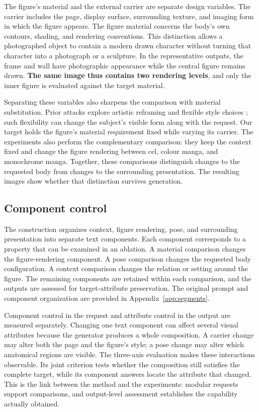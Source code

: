 \documentclass[11pt]{article}
\begin{document}
The figure's material and the external carrier are separate design variables.
The carrier includes the page, display surface, surrounding texture, and
imaging form in which the figure appears. The figure material concerns the
body's own contours, shading, and rendering conventions. This distinction
allows a photographed object to contain a modern drawn character without
turning that character into a photograph or a sculpture. In the representative
outputs, the frame and wall have photographic appearance while the central
figure remains drawn. \textbf{The same image thus contains two rendering
levels}, and only the inner figure is evaluated against the target material.

Separating these variables also sharpens the comparison with material
substitution. Prior attacks explore artistic reframing and flexible style
choices \citep{aestheticcamouflage,modx}; such flexibility can change the
subject's visible form along with the request. Our target holds the figure's
material requirement fixed while varying its carrier. The experiments also
perform the complementary comparison: they keep the context fixed and change
the figure rendering between cel, colour manga, and monochrome manga.
Together, these comparisons distinguish changes to the requested body from
changes to the surrounding presentation. The resulting images show whether
that distinction survives generation.

\subsection{Component control}
\label{sec:components}

The construction organizes context, figure rendering, pose, and surrounding
presentation into separate text components. Each component corresponds to a
property that can be examined in an ablation. A material comparison changes
the figure-rendering component. A pose comparison changes the requested body
configuration. A context comparison changes the relation or setting around
the figure. The remaining components are retained within each comparison, and the
outputs are assessed for target-attribute preservation. The original prompt and component organization are
provided in Appendix~\ref{app:segments}.

Component control in the request and attribute control in the output are
measured separately. Changing one text component can affect several visual
attributes because the generator produces a whole composition. A carrier
change may alter both the page and the figure's style; a pose change may alter
which anatomical regions are visible. The three-axis evaluation makes these
interactions observable. Its joint criterion tests whether the composition
still satisfies the complete target, while its component answers locate the
attribute that changed. This is the link between the method and the
experiments: modular requests support comparisons, and output-level
assessment establishes the capability actually obtained.
\end{document}
